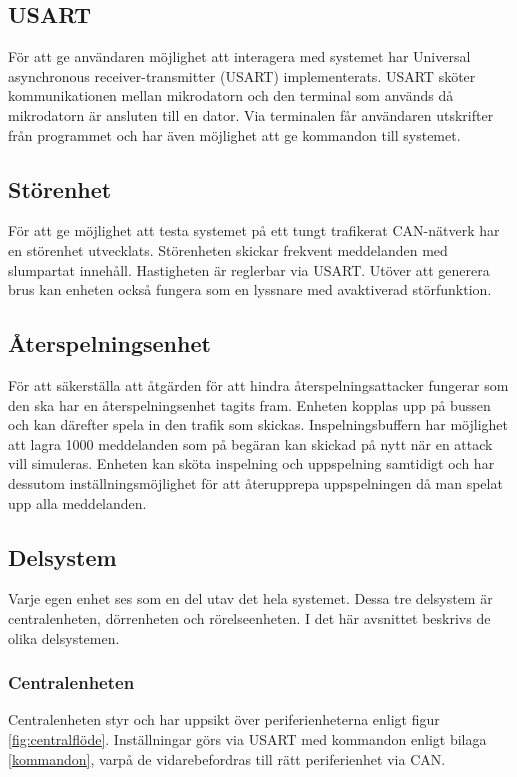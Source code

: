 \documentclass{article}
\begin{document}
\subsection{USART}
För att ge användaren möjlighet att interagera med systemet har Universal asynchronous receiver-transmitter (USART) implementerats. USART sköter kommunikationen mellan mikrodatorn och den terminal som används då mikrodatorn är ansluten till en dator. Via terminalen får användaren utskrifter från programmet och har även möjlighet att ge kommandon till systemet.


\subsection{Störenhet}
För att ge möjlighet att testa systemet på ett tungt trafikerat CAN-nätverk har en störenhet utvecklats. Störenheten skickar frekvent meddelanden med slumpartat innehåll. Hastigheten är reglerbar via USART. Utöver att generera brus kan enheten också fungera som en lyssnare med avaktiverad störfunktion.

\subsection{Återspelningsenhet}
För att säkerställa att åtgärden för att hindra återspelningsattacker fungerar som den ska har en återspelningsenhet tagits fram. Enheten kopplas upp på bussen och kan därefter spela in den trafik som skickas. Inspelningsbuffern har möjlighet att lagra 1000 meddelanden som på begäran kan skickad på nytt när en attack vill simuleras. Enheten kan sköta inspelning och uppspelning samtidigt och har dessutom inställningsmöjlighet för att återupprepa uppspelningen då man spelat upp alla meddelanden.


\subsection{Delsystem }
Varje egen enhet ses som en del utav det hela systemet. Dessa tre delsystem är
centralenheten, dörrenheten och rörelseenheten. I det här avsnittet beskrivs de
olika delsystemen.
\subsubsection{Centralenheten}
\label{subsec:centralenhet}

Centralenheten styr och har uppsikt över periferienheterna enligt figur \ref{fig:centralflöde}.
Inställningar görs via USART med kommandon enligt bilaga \ref{kommandon}, varpå de vidarebefordras till rätt periferienhet via CAN.
\end{document}

